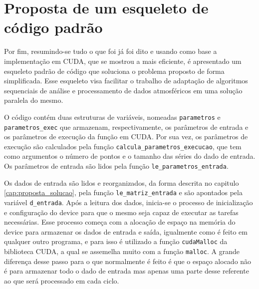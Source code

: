 \chapter{Proposta de um esqueleto de código padrão}

Por fim, resumindo-se tudo o que foi já foi dito e usando como base a implementação em CUDA, que se mostrou a mais eficiente, é apresentado um esqueleto padrão de código que soluciona o problema proposto de forma simplificada. Esse esqueleto visa facilitar o trabalho de adaptação de algoritmos sequenciais de análise e processamento de dados atmosféricos em uma solução paralela do mesmo. 

O código contém duas estruturas de variáveis, nomeadas \texttt{parametros} e \texttt{parametros\_exec} que armazenam, respectivamente, os parâmetros de entrada e os parâmetros de execução da função em CUDA. Por sua vez, os parâmetros de execução são calculados pela função \texttt{calcula\_parametros\_execucao}, que tem como argumentos o número de pontos e o tamanho das séries do dado de entrada. Os parâmetros de entrada são lidos pela função \texttt{le\_parametros\_entrada}.

Os dados de entrada são lidos e reorganizados, da forma descrita no capitulo \ref{cap:proposta_solucao}, pela função \texttt{le\_matriz\_entrada} e são apontados pela variável \texttt{d\_entrada}. Após a leitura dos dados, inicia-se o processo de inicialização e configuração do device para que o mesmo seja capaz de executar as tarefas necessárias. Esse processo começa com a alocação de espaço na memória do device para armazenar os dados de entrada e saída, igualmente como é feito em qualquer outro programa, e para isso é utilizado a função \texttt{cudaMalloc} da biblioteca CUDA, a qual se assemelha muito com a função \texttt{malloc}. A grande diferença desse passo para o que normalmente é feito é que o espaço alocado não é para armazenar todo o dado de entrada mas apenas uma parte desse referente ao que será processado em cada ciclo.

